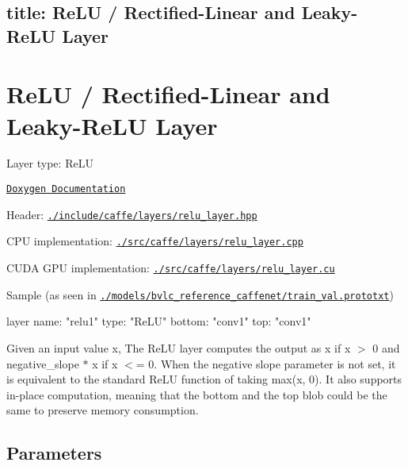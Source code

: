 

 \subsection*{title\+: Re\+LU / Rectified-\/\+Linear and Leaky-\/\+Re\+LU Layer }

\section*{Re\+LU / Rectified-\/\+Linear and Leaky-\/\+Re\+LU Layer}


\begin{DoxyItemize}
\item Layer type\+: {\ttfamily Re\+LU}
\item \href{http://caffe.berkeleyvision.org/doxygen/classcaffe_1_1ReLULayer.html}{\tt Doxygen Documentation}
\item Header\+: \href{https://github.com/BVLC/caffe/blob/master/include/caffe/layers/relu_layer.hpp}{\tt {\ttfamily ./include/caffe/layers/relu\+\_\+layer.hpp}}
\item C\+PU implementation\+: \href{https://github.com/BVLC/caffe/blob/master/src/caffe/layers/relu_layer.cpp}{\tt {\ttfamily ./src/caffe/layers/relu\+\_\+layer.cpp}}
\item C\+U\+DA G\+PU implementation\+: \href{https://github.com/BVLC/caffe/blob/master/src/caffe/layers/relu_layer.cu}{\tt {\ttfamily ./src/caffe/layers/relu\+\_\+layer.cu}}
\item Sample (as seen in \href{https://github.com/BVLC/caffe/blob/master/models/bvlc_reference_caffenet/train_val.prototxt}{\tt {\ttfamily ./models/bvlc\+\_\+reference\+\_\+caffenet/train\+\_\+val.prototxt}}) \begin{DoxyVerb}layer {
  name: "relu1"
  type: "ReLU"
  bottom: "conv1"
  top: "conv1"
}
\end{DoxyVerb}

\end{DoxyItemize}

Given an input value x, The {\ttfamily Re\+LU} layer computes the output as x if x $>$ 0 and negative\+\_\+slope $\ast$ x if x $<$= 0. When the negative slope parameter is not set, it is equivalent to the standard Re\+LU function of taking max(x, 0). It also supports in-\/place computation, meaning that the bottom and the top blob could be the same to preserve memory consumption.

\subsection*{Parameters}


